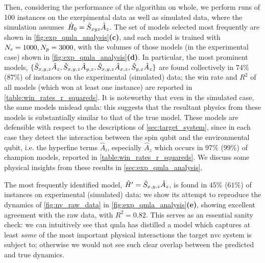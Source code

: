 Then, considering the performance of the algorithm on whole, 
    we perform \glspl{run} of 100 \glspl{instance} on the exerpimental data as well as simulated data,
    where the simulation assumes\footnotemark \ $\hat{H}_0 = \hat{S}_{xyz} \hat{A}_z$.
    The set of models selected most frequently are shown in \cref{fig:exp_qmla_analysis}\textbf{(c)},
    and each model is trained with $N_e=1000, N_p=3000$,
    with the \glspl{volume} of those models (in the experimental case) shown in  \cref{fig:exp_qmla_analysis}\textbf{(d)}.
In particular, the most prominent models, $\{ \hat{S}_{x,y,z}\hat{A}_{z}, \hat{S}_{x,y,z}\hat{A}_{y,z}, \hat{S}_{x,y,z}\hat{A}_{x,z}, \hat{S}_{y,z}\hat{A}_{z} \}$ are found collectively in 74\% (87\%)
    of \glspl{instance} on the experimental (simulated) data;
    the  \gls{win rate} and $R^2$ of all models (which won at least one instance) are reported in \cref{table:win_rates_r_squareds}. 
It is noteworthy that even in the simulated case, the same models mislead \gls{qmla}:
    this suggests that the resultant physics from these models is substantially similar to that of the  \gls{true model}\footnotemark. 
These models are defensible with respect to the descriptions of \cref{sec:target_system}, 
    since in each case they detect the interaction between the spin qubit and the environmental qubit, 
    i.e. the hyperfine terms $\hat{A}_i$, especially $\hat{A}_z$ which occurs in 97\% (99\%) of \glspl{champion model}, 
    reported in \cref{table:win_rates_r_squareds}. 
We discuss some physical insights from these results in \cref{sec:exp_qmla_analysis}.   
\par 

The most frequently identified model, $\hat{H}^{\prime} = \hat{S}_{x,y,z}\hat{A}_{z}$, is found in $45\%$ ($61\%$) of instances
    on experimental (simulated) data:
    we show its attempt to reproduce the dynamics of \cref{fig:nv_raw_data} in \cref{fig:exp_qmla_analysis}\textbf{(e)}, 
    showing excellent agreement with the raw data, with $R^2=0.82$. 
This serves as an essential sanity check: 
    we can intuitively see that \gls{qmla} has distilled a model which captures at least \emph{some} 
    of the most important physical interactions the target \gls{nvc} system is subject to; 
    otherwise we would not see such clear overlap between the predicted and true dynamics. 
\par 

